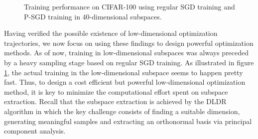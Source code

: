 \documentclass[11pt, a4paper]{article}
\begin{document}
\begin{figure}[!h]
\centering
{}
\caption{\centering Training performance on CIFAR-100 using regular SGD training and P-SGD training in 40-dimensional subspaces.}
\label{fig:exp1}
\end{figure}

Having verified the possible existence of low-dimensional optimization trajectories, we now focus on using these findings to design powerful optimization methods. As of now, training in low-dimensional subspaces was always preceded by a heavy sampling stage based on regular SGD training. As illustrated in figure \ref{fig:exp1}, the actual training in the low-dimensional subspace seems to happen pretty fast. Thus, to design a cost efficient but powerful low-dimensional optimization method, it is key to minimize the computational effort spent on subspace extraction. Recall that the subspace extraction is achieved by the DLDR algorithm in which the key challenge consists of finding a suitable dimension, generating meaningful samples and extracting an orthonormal basis via principal component analysis. \\
\end{document}
